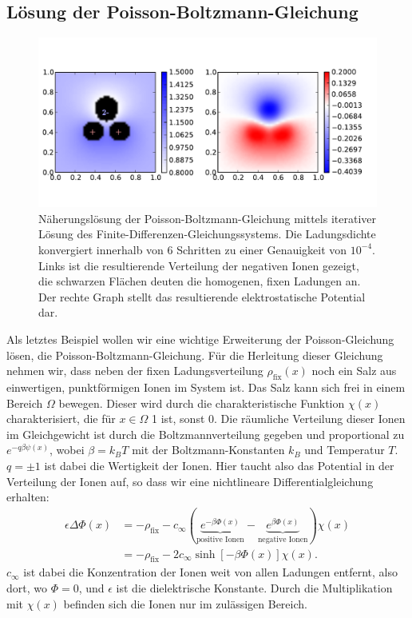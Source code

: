 \subsection{Lösung der Poisson-Boltzmann-Gleichung}

\begin{figure}
  \centering
  \includegraphics[width=\textwidth]{plots/pb}
  \caption{Näherungslösung der Poisson-Boltzmann-Gleichung mittels
    iterativer Lösung des Finite-Differenzen-Gleichungssystems. Die
    Ladungsdichte konvergiert innerhalb von 6 Schritten zu einer
    Genauigkeit von $10^{-4}$. Links ist die resultierende Verteilung
    der negativen Ionen gezeigt, die schwarzen Flächen deuten die
    homogenen, fixen Ladungen an. Der rechte Graph stellt das
    resultierende elektrostatische Potential dar.}
  \label{fig:pb}
\end{figure}

Als letztes Beispiel wollen wir eine wichtige Erweiterung der
Poisson-Gleichung lösen, die Poisson-Boltzmann-Gleichung. Für die
Herleitung dieser Gleichung nehmen wir, dass neben der fixen
Ladungsverteilung $\rho_\text{fix}(x)$ noch ein Salz aus einwertigen,
punktförmigen Ionen im System ist. Das Salz kann sich frei in einem
Bereich $\Omega$ bewegen. Dieser wird durch die charakteristische
Funktion $\chi(x)$ charakterisiert, die für $x\in\Omega$ 1 ist, sonst
0. Die räumliche Verteilung dieser Ionen im Gleichgewicht ist durch
die Boltzmannverteilung gegeben und proportional zu
$e^{-q\beta\psi(x)}$, wobei $\beta=k_BT$ mit der Boltzmann-Konstanten
$k_B$ und Temperatur $T$. $q=\pm 1$ ist dabei die Wertigkeit der
Ionen. Hier taucht also das Potential in der Verteilung der Ionen auf,
so dass wir eine nichtlineare Differentialgleichung erhalten:
\begin{align}
  \label{eq:pb}
  \epsilon\Delta \Phi(x)  &=
  -\rho_\text{fix} - c_\infty\left(\underbrace{e^{-\beta
        \Phi(x)}}_\text{positive Ionen} - \underbrace{e^{\beta
        \Phi(x)}}_\text{negative Ionen}\right)\chi(x)\nonumber\\
  &=
  -\rho_\text{fix} - 2c_\infty\sinh[-\beta \Phi(x)]\chi(x).
\end{align}
$c_\infty$ ist dabei die Konzentration der Ionen weit von allen
Ladungen entfernt, also dort, wo $\Phi=0$, und $\epsilon$ ist die
dielektrische Konstante. Durch die Multiplikation mit $\chi(x)$
befinden sich die Ionen nur im zulässigen Bereich.

